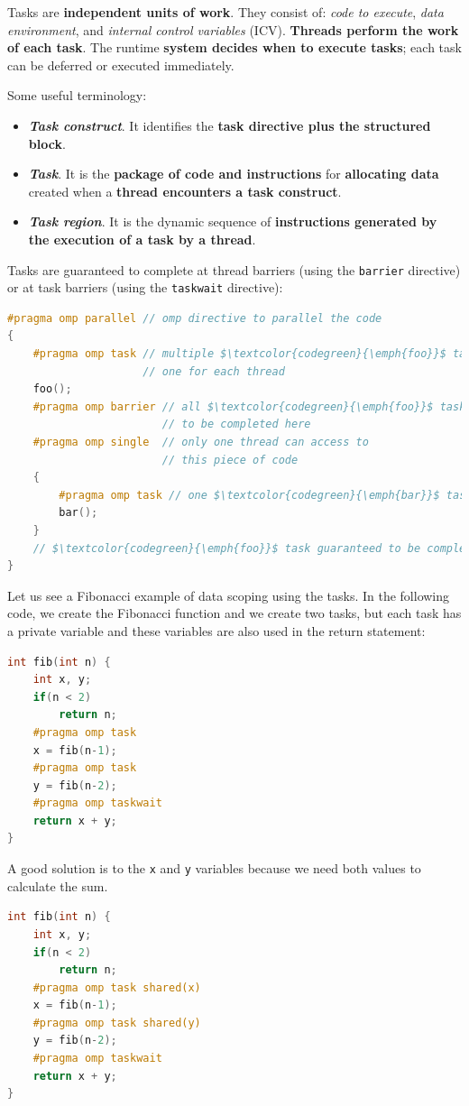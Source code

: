\highspace
Tasks are \textbf{independent units of work}. They consist of: \emph{code to execute}, \emph{data environment}, and \emph{internal control variables} (ICV). \textbf{Threads perform the work of each task}. The runtime \textbf{system decides when to execute tasks}; each task can be deferred or executed immediately.

\highspace
Some useful terminology:
\begin{itemize}
    \item \textbf{\emph{Task construct}}. It identifies the \textbf{task directive plus the structured block}.
    
    \item \textbf{\emph{Task}}. It is the \textbf{package of code and instructions} for \textbf{allocating data} created when a \textbf{thread encounters a task construct}.
    
    \item \textbf{\emph{Task region}}. It is the dynamic sequence of \textbf{instructions generated by the execution of a task by a thread}.
\end{itemize}
Tasks are guaranteed to complete at thread barriers (using the \texttt{barrier} directive) or at task barriers (using the \texttt{taskwait} directive):
\begin{lstlisting}[language=C++, mathescape=true]
#pragma omp parallel // omp directive to parallel the code
{
    #pragma omp task // multiple $\textcolor{codegreen}{\emph{foo}}$ tasks created here, 
                     // one for each thread
    foo();
    #pragma omp barrier // all $\textcolor{codegreen}{\emph{foo}}$ tasks guaranteed 
                        // to be completed here
    #pragma omp single  // only one thread can access to 
                        // this piece of code
    {
        #pragma omp task // one $\textcolor{codegreen}{\emph{bar}}$ task created here
        bar();
    }
    // $\textcolor{codegreen}{\emph{foo}}$ task guaranteed to be completed here
}
\end{lstlisting}
\begin{examplebox}
    Let us see a Fibonacci example of data scoping using the tasks. In the following code, we create the Fibonacci function and we create two tasks, but each task has a private variable and these variables are also used in the return statement:
    \begin{lstlisting}[language=C++]
int fib(int n) {
    int x, y;
    if(n < 2)
        return n;
    #pragma omp task
    x = fib(n-1);
    #pragma omp task
    y = fib(n-2);
    #pragma omp taskwait
    return x + y;
}\end{lstlisting}
    A good solution is to  the \texttt{x} and \texttt{y} variables because we need both values to calculate the sum.
    \begin{lstlisting}[language=C++]
int fib(int n) {
    int x, y;
    if(n < 2)
        return n;
    #pragma omp task shared(x)
    x = fib(n-1);
    #pragma omp task shared(y)
    y = fib(n-2);
    #pragma omp taskwait
    return x + y;
}\end{lstlisting}
\end{examplebox}

